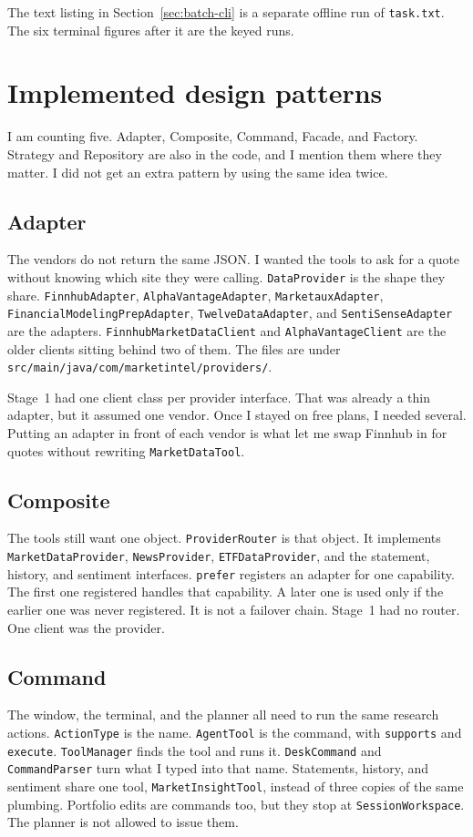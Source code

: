 \documentclass[11pt]{article}
\begin{document}
The text listing in Section~\ref{sec:batch-cli} is a separate offline run of \texttt{task.txt}. The six terminal figures after it are the keyed runs.

\section{Implemented design patterns}

I am counting five. Adapter, Composite, Command, Facade, and Factory. Strategy and Repository are also in the code, and I mention them where they matter. I did not get an extra pattern by using the same idea twice.

\subsection{Adapter}
The vendors do not return the same JSON. I wanted the tools to ask for a quote without knowing which site they were calling. \texttt{DataProvider} is the shape they share. \texttt{FinnhubAdapter}, \texttt{AlphaVantageAdapter}, \texttt{MarketauxAdapter}, \texttt{FinancialModelingPrepAdapter}, \texttt{TwelveDataAdapter}, and \texttt{SentiSenseAdapter} are the adapters. \texttt{FinnhubMarketDataClient} and \texttt{AlphaVantageClient} are the older clients sitting behind two of them. The files are under \texttt{src/main/java/com/marketintel/providers/}.

Stage~1 had one client class per provider interface. That was already a thin adapter, but it assumed one vendor. Once I stayed on free plans, I needed several. Putting an adapter in front of each vendor is what let me swap Finnhub in for quotes without rewriting \texttt{MarketDataTool}.

\subsection{Composite}
The tools still want one object. \texttt{ProviderRouter} is that object. It implements \texttt{MarketDataProvider}, \texttt{NewsProvider}, \texttt{ETFDataProvider}, and the statement, history, and sentiment interfaces. \texttt{prefer} registers an adapter for one capability. The first one registered handles that capability. A later one is used only if the earlier one was never registered. It is not a failover chain. Stage~1 had no router. One client was the provider.

\subsection{Command}
The window, the terminal, and the planner all need to run the same research actions. \texttt{ActionType} is the name. \texttt{AgentTool} is the command, with \texttt{supports} and \texttt{execute}. \texttt{ToolManager} finds the tool and runs it. \texttt{DeskCommand} and \texttt{CommandParser} turn what I typed into that name. Statements, history, and sentiment share one tool, \texttt{MarketInsightTool}, instead of three copies of the same plumbing. Portfolio edits are commands too, but they stop at \texttt{SessionWorkspace}. The planner is not allowed to issue them.
\end{document}
